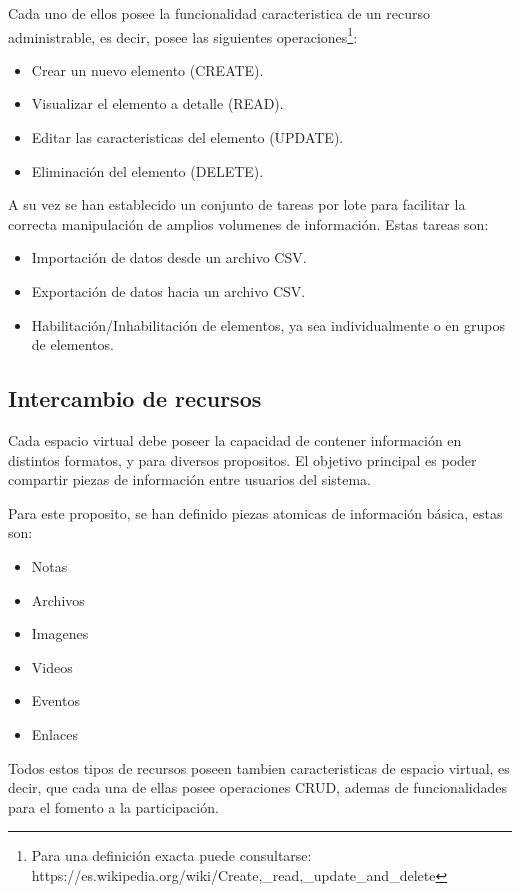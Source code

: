 Cada uno de ellos posee la funcionalidad caracteristica de un recurso
administrable, es decir, posee las siguientes operaciones\footnote{Para una
definición exacta puede consultarse:
https://es.wikipedia.org/wiki/Create,\_read,\_update\_and\_delete}:

\begin{itemize}
\item Crear un nuevo elemento (CREATE).
\item Visualizar el elemento a detalle (READ).
\item Editar las caracteristicas del elemento (UPDATE).
\item Eliminación del elemento (DELETE).
\end{itemize}

A su vez se han establecido un conjunto de tareas por lote para facilitar la
correcta manipulación de amplios volumenes de información. Estas tareas son:

\begin{itemize}
\item Importación de datos desde un archivo CSV.
\item Exportación de datos hacia un archivo CSV.
\item Habilitación/Inhabilitación de elementos, ya sea individualmente o en
      grupos de elementos.
\end{itemize}

\subsection{Intercambio de recursos}

Cada espacio virtual debe poseer la capacidad de contener información en
distintos formatos, y para diversos propositos. El objetivo principal es poder
compartir piezas de información entre usuarios del sistema.

Para este proposito, se han definido piezas atomicas de información básica,
estas son:

\begin{itemize}
\item Notas
\item Archivos
\item Imagenes
\item Videos
\item Eventos
\item Enlaces
\end{itemize}

Todos estos tipos de recursos poseen tambien caracteristicas de espacio virtual,
es decir, que cada una de ellas posee operaciones CRUD, ademas de
funcionalidades para el fomento a la participación.


